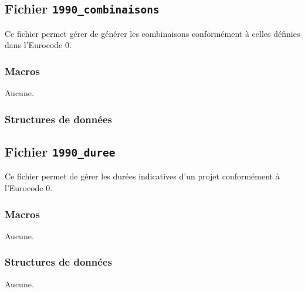 \documentclass{article}
\begin{document}
\subsection{Fichier {\texttt{1990\_combinaisons}}}
Ce fichier permet gérer de générer les combinaisons conformément à celles définies dans l'Eurocode 0.
\subsubsection{Macros}
Aucune.
\subsubsection{Structures de données}















\subsection{Fichier {\texttt{1990\_duree}}}
Ce fichier permet de gérer les durées indicatives d'un projet conformément à l'Eurocode 0.
\subsubsection{Macros}
Aucune.
\subsubsection{Structures de données}
Aucune.












\end{document}
